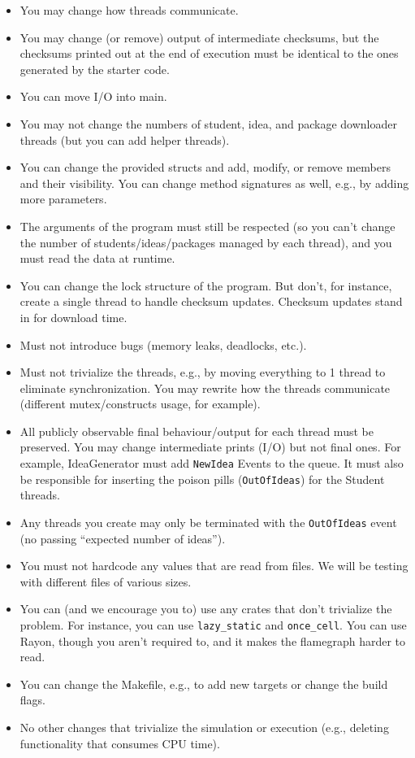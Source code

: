 \begin{itemize}
	\item You may change how threads communicate.
	\item You may change (or remove) output of intermediate checksums, but the checksums printed out at the end of execution must be identical to the ones generated by the starter code.
        \item You can move I/O into main.
	\item You may not change the numbers of student, idea, and package downloader threads (but you can add helper threads).
        \item You can change the provided structs and add, modify, or remove members and their visibility. You can change method signatures as well, e.g., by adding more parameters.
	\item The arguments of the program must still be respected (so you can't change the number of students/ideas/packages managed by each thread), and you must read the data at runtime.
        \item You can change the lock structure of the program. But don't, for instance, create a single thread to handle checksum updates. Checksum updates stand in for download time.
	\item Must not introduce bugs (memory leaks, deadlocks, etc.). 
	\item Must not trivialize the threads, e.g., by moving everything to 1 thread to eliminate synchronization. You may rewrite how the threads communicate (different mutex/constructs usage, for example).
	\item All publicly observable final behaviour/output for each thread must be preserved. You may change intermediate prints (I/O) but not final ones. For example, IdeaGenerator must add \texttt{NewIdea} Events to the queue. It must also be responsible for inserting the poison pills (\texttt{OutOfIdeas}) for the Student threads.
	\item Any threads you create may only be terminated with the \texttt{OutOfIdeas} event (no passing ``expected number of ideas'').
	\item You must not hardcode any values that are read from files. We will be testing with different files of various sizes.
        \item You can (and we encourage you to) use any crates that don't trivialize the problem. For instance, you can use \texttt{lazy\_static} and \texttt{once\_cell}. You can use Rayon, though you aren't required to, and it makes the flamegraph harder to read.
        \item You can change the Makefile, e.g., to add new targets or change the build flags.
	\item No other changes that trivialize the simulation or execution (e.g., deleting functionality that consumes CPU time). 
\end{itemize}

